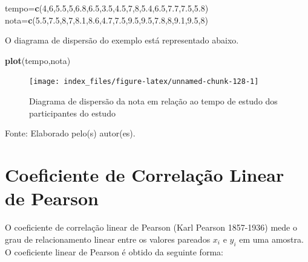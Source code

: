 \documentclass[12pt,brazil,]{book}
\newenvironment{Shaded}{\begin{snugshade}}{\end{snugshade}}
\newcommand{\DecValTok}[1]{\textcolor[rgb]{0.00,0.00,0.81}{#1}}
\newcommand{\FloatTok}[1]{\textcolor[rgb]{0.00,0.00,0.81}{#1}}
\newcommand{\KeywordTok}[1]{\textcolor[rgb]{0.13,0.29,0.53}{\textbf{#1}}}
\newcommand{\NormalTok}[1]{#1}
\begin{document}
\begin{Shaded}
\begin{Highlighting}[]
\NormalTok{tempo=}\KeywordTok{c}\NormalTok{(}\DecValTok{4}\NormalTok{,}\DecValTok{6}\NormalTok{,}\FloatTok{5.5}\NormalTok{,}\DecValTok{5}\NormalTok{,}\FloatTok{6.8}\NormalTok{,}\FloatTok{6.5}\NormalTok{,}\FloatTok{3.5}\NormalTok{,}\FloatTok{4.5}\NormalTok{,}\DecValTok{7}\NormalTok{,}\DecValTok{8}\NormalTok{,}\FloatTok{5.4}\NormalTok{,}\FloatTok{6.5}\NormalTok{,}\FloatTok{7.7}\NormalTok{,}\FloatTok{7.5}\NormalTok{,}\FloatTok{5.8}\NormalTok{)}
\NormalTok{nota=}\KeywordTok{c}\NormalTok{(}\FloatTok{5.5}\NormalTok{,}\FloatTok{7.5}\NormalTok{,}\DecValTok{8}\NormalTok{,}\DecValTok{7}\NormalTok{,}\FloatTok{8.1}\NormalTok{,}\FloatTok{8.6}\NormalTok{,}\FloatTok{4.7}\NormalTok{,}\FloatTok{7.5}\NormalTok{,}\FloatTok{9.5}\NormalTok{,}\FloatTok{9.5}\NormalTok{,}\FloatTok{7.8}\NormalTok{,}\DecValTok{8}\NormalTok{,}\FloatTok{9.1}\NormalTok{,}\FloatTok{9.5}\NormalTok{,}\DecValTok{8}\NormalTok{)}
\end{Highlighting}
\end{Shaded}

O diagrama de dispersão do exemplo está representado abaixo.

\begin{Shaded}
\begin{Highlighting}[]
\KeywordTok{plot}\NormalTok{(tempo,nota)}
\end{Highlighting}
\end{Shaded}

\begin{figure}

{\centering \texttt{[image: index\_files/figure-latex/unnamed-chunk-128-1]} 

}

\caption{Diagrama de dispersão da nota em relação ao tempo de estudo dos participantes do estudo}\label{fig:unnamed-chunk-128}
\end{figure}

Fonte: Elaborado pelo(s) autor(es).

\hypertarget{coeficiente-de-correlacao-linear-de-pearson}{%
\section{Coeficiente de Correlação Linear de
Pearson}\label{coeficiente-de-correlacao-linear-de-pearson}}

O coeficiente de correlação linear de Pearson (Karl Pearson 1857-1936)
mede o grau de relacionamento linear entre os valores pareados \(x_i\) e
\(y_i\) em uma amostra. O coeficiente linear de Pearson é obtido da
seguinte forma:
\end{document}
